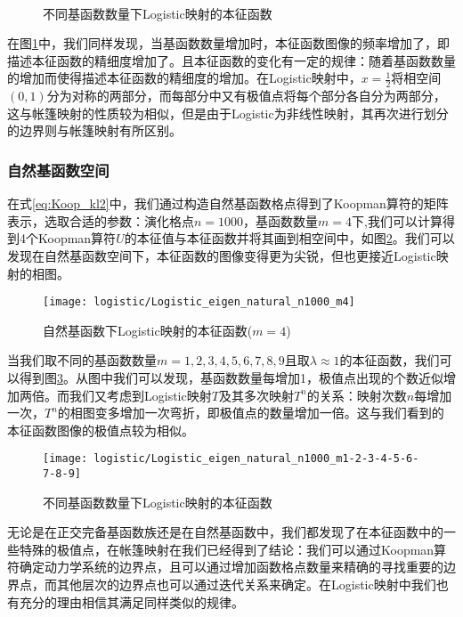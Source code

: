 \begin{figure}[!]
  \centering
    \\
  \caption{不同基函数数量下Logistic映射的本征函数}\label{fig:logi_eig_RGFL_multim}
\end{figure}

在图\ref{fig:logi_eig_RGFL_multim}中，我们同样发现，当基函数数量增加时，本征函数图像的频率增加了，即描述本征函数的精细度增加了。且本征函数的变化有一定的规律：随着基函数数量的增加而使得描述本征函数的精细度的增加。在Logistic映射中，$x=\frac{1}{2}$将相空间$(0,1)$分为对称的两部分，而每部分中又有极值点将每个部分各自分为两部分，这与帐篷映射的性质较为相似，但是由于Logistic为非线性映射，其再次进行划分的边界则与帐篷映射有所区别。

\subsubsection{自然基函数空间}
在式\eqref{eq:Koop_kl2}中，我们通过构造自然基函数格点得到了Koopman算符的矩阵表示，选取合适的参数：演化格点$n=1000$，基函数数量$m=4$下,我们可以计算得到4个Koopman算符$U$的本征值与本征函数并将其画到相空间中，如图\ref{fig:Logistic_eigen_natural_n1000_m4}。我们可以发现在自然基函数空间下，本征函数的图像变得更为尖锐，但也更接近Logistic映射的相图。
\begin{figure}[!]
	\centering
	\texttt{[image: logistic/Logistic\_eigen\_natural\_n1000\_m4]}
    \caption{自然基函数下Logistic映射的本征函数($m=4$)}\label{fig:Logistic_eigen_natural_n1000_m4}
\end{figure}
当我们取不同的基函数数量$m=1,2,3,4,5,6,7,8,9$且取$\lambda\approx 1$的本征函数，我们可以得到图\ref{Logistic_eigen_natural_n5000_m1-2-3-4-5-6-7-8-9}。从图中我们可以发现，基函数数量每增加1，极值点出现的个数近似增加两倍。而我们又考虑到Logistic映射$T$及其多次映射$T^n$的关系：映射次数$n$每增加一次，$T^n$的相图变多增加一次弯折，即极值点的数量增加一倍。这与我们看到的本征函数图像的极值点较为相似。
\begin{figure}[!]
	\centering
	\texttt{[image: logistic/Logistic\_eigen\_natural\_n1000\_m1-2-3-4-5-6-7-8-9]}
    \caption{不同基函数数量下Logistic映射的本征函数}\label{Logistic_eigen_natural_n5000_m1-2-3-4-5-6-7-8-9}
\end{figure}
无论是在正交完备基函数族还是在自然基函数中，我们都发现了在本征函数中的一些特殊的极值点，在帐篷映射在我们已经得到了结论：我们可以通过Koopman算符确定动力学系统的边界点，且可以通过增加函数格点数量来精确的寻找重要的边界点，而其他层次的边界点也可以通过迭代关系来确定。在Logistic映射中我们也有充分的理由相信其满足同样类似的规律。

